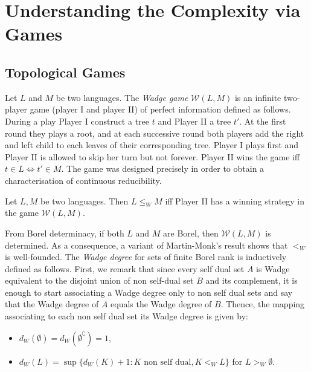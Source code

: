
\section{Understanding the Complexity via Games}

\subsection{Topological Games}
Let $L$ and $M$ be two languages. The {\em Wadge game}
$\mathcal{W}(L, M)$ is an infinite two-player game (player I and player II) of perfect information defined as follows. During a play Player I construct a tree $t$ and Player II a tree $t'$. At the first round they plays a root, and at each successive round  both players add the right and left child to each leaves
of their corresponding tree. Player I plays first and Player II is allowed to
skip her turn but not forever.  Player II wins the game iff $t \in L
\Leftrightarrow t' \in M$.  
The game was designed precisely in order to obtain a characterisation of continuous reducibility.
\begin{lemma}
Let $L, M$ be two languages. Then  $L \leq_W M$ iff Player II has a winning strategy in the game $\mathcal{W}(L, M)$.
\end{lemma}


  From Borel determinacy,
if both $L$ and $M$ are Borel, then $\mathcal{W}(L, M)$ is determined.
As a consequence, a variant of Martin-Monk's result shows that $<_W$ is
well-founded. The \emph{Wadge degree} for sets of finite Borel rank is
inductively defined as follows. First, we remark that since every self dual set $A$ is Wadge equivalent to the disjoint union of non self-dual set $B$ and its complement, it is enough to start associating a Wadge degree only to non self dual sets and say that the Wadge degree of $A$ equals the Wadge degree of $B$. Thence, the mapping associating to each non self dual set its Wadge degree is given by:
\begin{itemize}
\item $d_W(\emptyset)=d_W(\emptyset^\complement)=1$,
\item $d_W(L)=\sup\{d_W(K)+1\colon K \text{ non self dual}, K <_WL\}$ for $L>_W\emptyset$.
\end{itemize}

